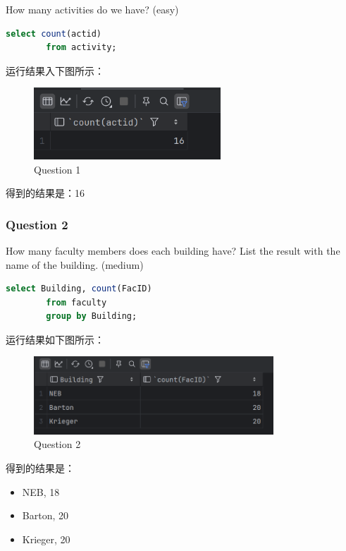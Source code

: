 \documentclass{article}
\begin{document}
    How many activities do we have?  (easy)
    
    \begin{lstlisting}[language=sql, title=Queation 1, tabsize=4]
    	select count(actid)
    	from activity;
    \end{lstlisting}
    
    运行结果入下图所示：
    
    \begin{figure}[H]
    	\centering
    	\includegraphics[width=7cm]{./images/4.Question1.png}
    	\caption{Question 1}
    \end{figure}
    
    得到的结果是：16
    
    \subsubsection{Question 2}
    
    How many faculty members does each building have? List the result with the name of the building.  (medium)
    
    \begin{lstlisting}[language=sql, title=Question 2, tabsize=4]
    	select Building, count(FacID)
    	from faculty
    	group by Building;
    \end{lstlisting}
    
    运行结果如下图所示：
    
    \begin{figure}[H]
    	\centering
    	\includegraphics[width=9cm]{./images/5.Question2.png}
    	\caption{Question 2}
    \end{figure}
    
    得到的结果是：
    \begin{itemize}
    	\item NEB, 18
    	\item Barton, 20
    	\item Krieger, 20
    \end{itemize}
    
\end{document}

